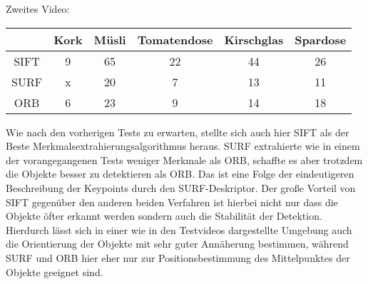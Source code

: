 Zweites Video:

\begin{center}
    \begin{tabular}{ c | C | C | C | C | C |}
      & Kork & Müsli & Tomatendose & Kirschglas & Spardose \\ \hline
    SIFT & 9 & 65 & 22 & 44 & 26 \\ \hline
    SURF & x & 20 & 7 & 13 & 11 \\ \hline
    ORB & 6 & 23 & 9 & 14 & 18 \\
    \hline
    \end{tabular}
\end{center}

Wie nach den vorherigen Tests zu erwarten, stellte sich auch hier SIFT als der Beste Merkmalsextrahierungsalgorithmus heraus.
SURF extrahierte wie in einem der vorangegangenen Tests weniger Merkmale als ORB, schaffte es aber trotzdem die Objekte besser zu detektieren als ORB.
Das ist eine Folge der eindeutigeren Beschreibung der Keypoints durch den SURF-Deskriptor.
Der große Vorteil von SIFT gegenüber den anderen beiden Verfahren ist hierbei nicht nur dass die Objekte öfter erkannt werden sondern auch die Stabilität der Detektion.
Hierdurch lässt sich in einer wie in den Testvideos dargestellte Umgebung auch die Orientierung der Objekte mit sehr guter Annäherung bestimmen, während SURF und ORB hier eher nur zur Positionsbestimmung des Mittelpunktes der Objekte geeignet sind.